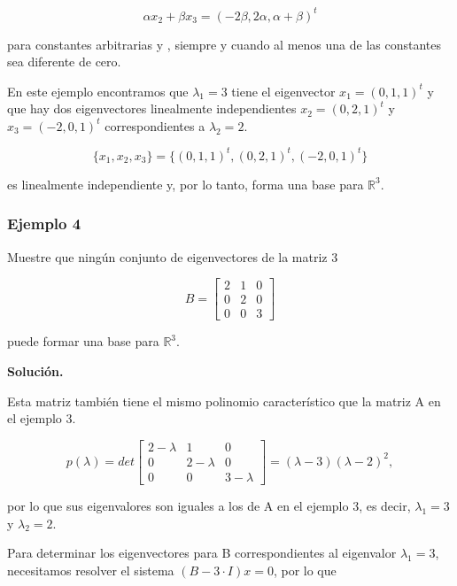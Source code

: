 \documentclass{report}
\numberwithin{subsection}{section} %
\begin{document}
    $$\alpha x_2 + βx_3 = (-2\beta, 2\alpha , \alpha  + \beta)^t$$

    para constantes arbitrarias \alpha y \beta, siempre y cuando al menos una de las constantes sea diferente de cero.

    En este ejemplo encontramos que $λ_1 = 3$ tiene el eigenvector $x_1 = (0, 1, 1)^t$ y que hay dos eigenvectores linealmente independientes $x_2 = (0, 2, 1)^t$ y $x_3 = (-2, 0, 1)^t$ correspondientes a $λ_2 = 2$.

    $$\{ x_1, x_2, x_3\} = \{(0, 1, 1)^t, (0, 2, 1)^t, (-2, 0, 1)^t \}$$

    es linealmente independiente y, por lo tanto, forma una base para $\mathbb{R}^3$.

\subsubsection*{Ejemplo 4}

    Muestre que ningún conjunto de eigenvectores de la matriz 3 

    $$B = \begin{bmatrix}
        2 & 1 & 0 \\
        0 & 2 & 0 \\
        0 & 0 & 3
    \end{bmatrix}$$

    puede formar una base para $\mathbb{R}^3$.

    {\bf Solución.}

    Esta matriz también tiene el mismo polinomio característico que la matriz A en el ejemplo 3.

    $$p(\lambda) = det\begin{bmatrix}
                        2-\lambda & 1 & 0 \\
                        0 & 2-\lambda & 0 \\
                        0 & 0 & 3-\lambda
                    \end{bmatrix} = (\lambda  - 3)(\lambda  - 2)^2,$$

    por lo que sus eigenvalores son iguales a los de A en el ejemplo 3, es decir, $λ_1 = 3$ y $λ_2 = 2$.
    
    Para determinar los eigenvectores para B correspondientes al eigenvalor $λ_1 = 3$, necesitamos
    resolver el sistema $(B - 3\cdot I)x = 0$, por lo que
\end{document}
